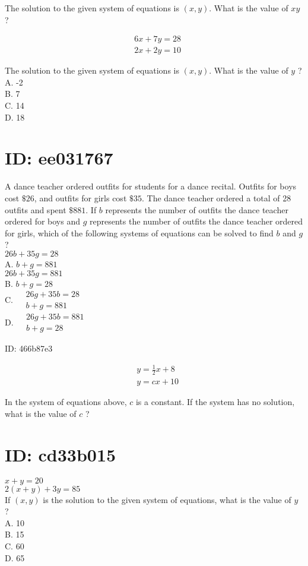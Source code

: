 The solution to the given system of equations is $(x, y)$. What is the value of $x y$ ?

$$
\begin{aligned}
& 6 x+7 y=28 \\
& 2 x+2 y=10
\end{aligned}
$$

The solution to the given system of equations is $(x, y)$. What is the value of $y$ ?\\
A. -2\\
B. 7\\
C. 14\\
D. 18

\section*{ID: ee031767}
A dance teacher ordered outfits for students for a dance recital. Outfits for boys cost $\$ 26$, and outfits for girls cost $\$ 35$. The dance teacher ordered a total of 28 outfits and spent $\$ 881$. If $b$ represents the number of outfits the dance teacher ordered for boys and $g$ represents the number of outfits the dance teacher ordered for girls, which of the following systems of equations can be solved to find $b$ and $g$ ?\\
$26 b+35 g=28$\\
A. $b+g=881$\\
$26 b+35 g=881$\\
B. $b+g=28$\\
C. $\begin{aligned} & 26 g+35 b=28 \\ & b+g=881\end{aligned}$\\
D. $\begin{aligned} & 26 g+35 b=881 \\ & b+g=28\end{aligned}$

ID: 466b87e3

$$
\begin{aligned}
& y=\frac{1}{2} x+8 \\
& y=c x+10
\end{aligned}
$$

In the system of equations above, $c$ is a constant. If the system has no solution, what is the value of $c$ ?

\section*{ID: cd33b015}
$x+y=20$\\
$2(x+y)+3 y=85$\\
If $(x, y)$ is the solution to the given system of equations, what is the value of $y$ ?\\
A. 10\\
B. 15\\
C. 60\\
D. 65

